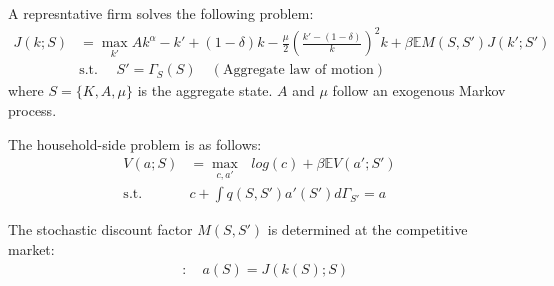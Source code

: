 A represntative firm solves the following problem:
\begin{align*}
  J(k;S) &= \max_{k'} Ak^{\alpha}  -k' + (1-\delta)k - \frac{\mu}{2}\left(\frac{k'-(1-\delta)}{k}\right)^{2}k + \beta\mathbb{E}M(S,S')J(k';S')
  \\
  & \text{s.t. }\quad S' = \Gamma_{S}(S) \quad(\text{Aggregate law of motion})
\end{align*}
where $S = \{K,A,\mu\}$ is the aggregate state. $A$ and $\mu$ follow an exogenous Markov process.

The household-side problem is as follows:
\begin{align*}
  V(a;S) &= \max_{c,a'}\text{ } log(c) + \beta \mathbb{E}V(a';S')
  \\
  \text{s.t.}\quad& c + \int q(S,S') a'(S') d\Gamma_{S'} =  a
\end{align*}

The stochastic discount factor $M(S,S')$ is determined at the competitive market:
\begin{align*}
  [M]&:\quad a(S) = J(k(S);S)
\end{align*}

